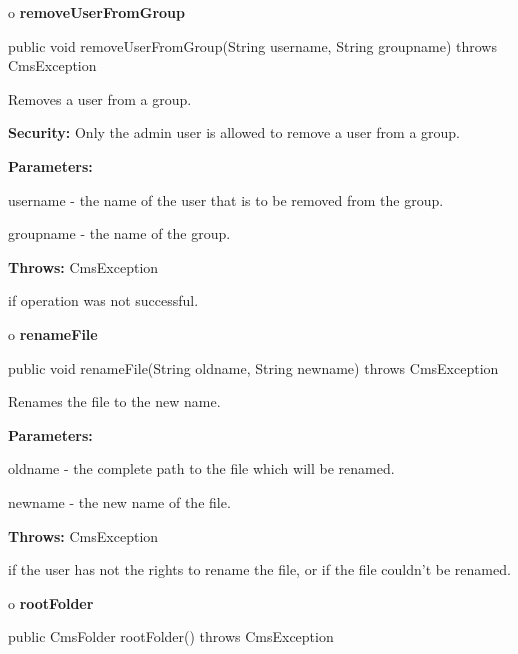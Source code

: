 o {\bf removeUserFromGroup} 

\begin{PRE}
 public void removeUserFromGroup(String username,
                                 String groupname) throws CmsException
\end{PRE}

\begin{description}
\htmlDD Removes a user from a group. 

{\bf Security:} Only the admin user is allowed to remove a user from a group. 

\begin{description}
\item {\bf Parameters:}  

username - the name of the user that is to be removed from the group.  

groupname - the name of the group.  
\item {\bf Throws:} CmsException  

if operation was not successful.  
\end{description}

\end{description}

o {\bf renameFile} 

\begin{PRE}
 public void renameFile(String oldname,
                        String newname) throws CmsException
\end{PRE}

\begin{description}
\htmlDD Renames the file to the new name. 

\begin{description}
\item {\bf Parameters:}  

oldname - the complete path to the file which will be renamed.  

newname - the new name of the file.  
\item {\bf Throws:} CmsException  

if the user has not the rights to rename the file, or if the file couldn't be
renamed.  
\end{description}

\end{description}

o {\bf rootFolder} 

\begin{PRE}
 public CmsFolder rootFolder() throws CmsException
\end{PRE}

